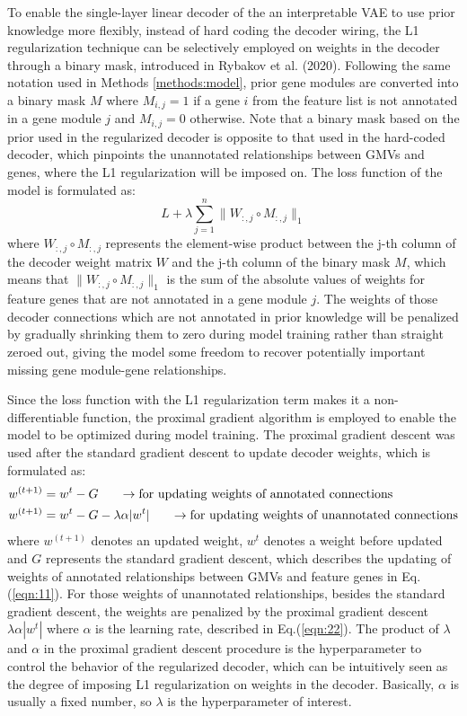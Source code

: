 To enable the single-layer linear decoder of the an interpretable VAE to use prior knowledge more flexibly, instead of hard coding the decoder wiring\cite{Seninge2021}, the L1 regularization technique can be selectively employed on weights in the decoder through a binary mask, introduced in Rybakov et al. (2020). Following the same notation used in Methods \ref{methods:model}, prior gene modules are converted into a binary mask $M$ where $M_{i,j} = 1$ if a gene $i$ from the feature list is not annotated in a gene module $j$ and $M_{i,j} = 0$ otherwise. Note that a binary mask based on the prior used in the regularized decoder is opposite to that used in the hard-coded decoder, which pinpoints the unannotated relationships between GMVs and genes, where the L1 regularization will be imposed on. The loss function of the model is formulated as:
\begin{equation}
    L + \lambda\sum^{n}_{j=1}\|W_{:,j}\circ M_{:,j}\|_1
\end{equation}
where $W_{:,j}\circ M_{:,j}$ represents the element-wise product between the j-th column of the decoder weight matrix $W$ and the j-th column of the binary mask $M$, which means that $\|W_{:,j}\circ M_{:,j}\|_1$ is the sum of the absolute values of weights for feature genes that are not annotated in a gene module $j$. The weights of those decoder connections which are not annotated in prior knowledge will be penalized by gradually shrinking them to zero during model training rather than straight zeroed out, giving the model some freedom to recover potentially important missing gene module-gene relationships.

Since the loss function with the L1 regularization term makes it a non-differentiable function, the proximal gradient algorithm\cite{Parikh2014} is employed to enable the model to be optimized during model training. The proximal gradient descent was used after the standard gradient descent to update decoder weights\cite{Seninge2021}, which is formulated as:
\begin{align}
    w^{(t+1)} &= w^t - G \;\;\;\;\;\; \to \textnormal{for updating weights of annotated connections}\label{eqn:11} \\
    w^{(t+1)} &= w^t - G - \lambda\alpha|w^t| \;\;\;\;\;\; \to \textnormal{for updating weights of unannotated connections}\label{eqn:22}
\end{align}
where $w^{(t+1)}$ denotes an updated weight, $w^t$ denotes a weight before updated and $G$ represents the standard gradient descent, which describes the updating of weights of annotated relationships between GMVs and feature genes in Eq.(\ref{eqn:11}). For those weights of unannotated relationships, besides the standard gradient descent, the weights are penalized by the proximal gradient descent $\lambda\alpha|w^t|$ where $\alpha$ is the learning rate, described in Eq.(\ref{eqn:22}). The product of $\lambda$ and $\alpha$ in the proximal gradient descent procedure is the hyperparameter to control the behavior of the regularized decoder, which can be intuitively seen as the degree of imposing L1 regularization on weights in the decoder. Basically, $\alpha$ is usually a fixed number, so $\lambda$ is the hyperparameter of interest.

